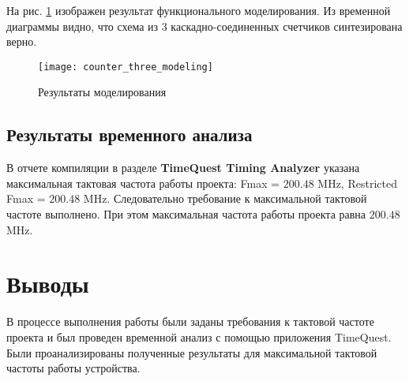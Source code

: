 На рис. \ref{fig:counter_three_modeling} изображен результат функционального моделирования. Из временной диаграммы видно, что схема из 3 каскадно-соединенных счетчиков синтезирована верно.

\begin{figure}[H]
\begin{center}
	\texttt{[image: counter\_three\_modeling]}
	\caption{Результаты моделирования}
	\label{fig:counter_three_modeling}
\end{center}
\end{figure}

\subsection{Результаты временного анализа}

В отчете компиляции в разделе \textbf{TimeQuest Timing Analyzer} указана максимальная тактовая частота работы проекта: Fmax = $200.48$ MHz, Restricted Fmax = $200.48$ MHz. Следовательно требование к максимальной тактовой частоте выполнено. При этом максимальная частота работы проекта равна $200.48$ MHz.

\section{Выводы}

В процессе выполнения работы были заданы требования к тактовой частоте проекта и был проведен временной анализ с помощью приложения TimeQuest. Были проанализированы полученные результаты для максимальной тактовой частоты работы устройства.

